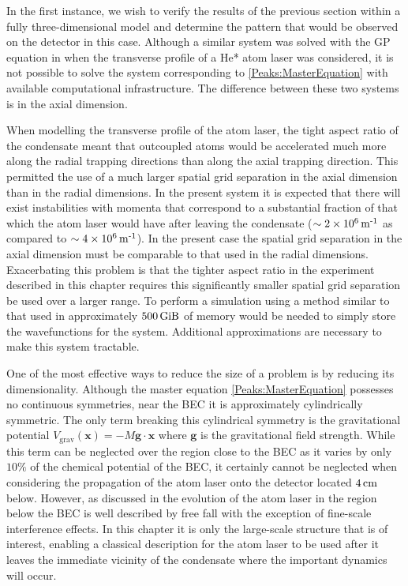In the first instance, we wish to verify the results of the previous section within a fully three-dimensional model and determine the pattern that would be observed on the detector in this case. Although a similar system was solved with the GP equation in  when the transverse profile of a He* atom laser was considered, it is not possible to solve the system corresponding to \eqref{Peaks:MasterEquation} with available computational infrastructure. The difference between these two systems is in the axial dimension.

When modelling the transverse profile of the atom laser, the tight aspect ratio of the condensate meant that outcoupled atoms would be accelerated much more along the radial trapping directions than along the axial trapping direction. This permitted the use of a much larger spatial grid separation in the axial dimension than in the radial dimensions. In the present system it is expected that there will exist instabilities with momenta that correspond to a substantial fraction of that which the atom laser would have after leaving the condensate ($\sim \unit[2 \times 10^6]{m\textsuperscript{-1}}$ as compared to $\sim \unit[4 \times 10^6]{m\textsuperscript{-1}}$). In the present case the spatial grid separation in the axial dimension must be comparable to that used in the radial dimensions. Exacerbating this problem is that the tighter aspect ratio in the experiment described in this chapter requires this significantly smaller spatial grid separation be used over a larger range. To perform a simulation using a method similar to that used in  approximately $\unit[500]{GiB}$ of memory would be needed to simply store the wavefunctions for the system. Additional approximations are necessary to make this system tractable.

One of the most effective ways to reduce the size of a problem is by reducing its dimensionality. Although the master equation \eqref{Peaks:MasterEquation} possesses no continuous symmetries, near the BEC it is approximately cylindrically symmetric. The only term breaking this cylindrical symmetry is the gravitational potential $V_\text{grav}(\bm{x}) =- M \bm{g} \cdot \bm{x}$ where $\bm{g}$ is the gravitational field strength. While this term can be neglected over the region close to the BEC as it varies by only $10\%$ of the chemical potential of the BEC, it certainly cannot be neglected when considering the propagation of the atom laser onto the detector located $\unit[4]{cm}$ below. However, as discussed in  the evolution of the atom laser in the region below the BEC is well described by free fall with the exception of fine-scale interference effects. In this chapter it is only the large-scale structure that is of interest, enabling a classical description for the atom laser to be used after it leaves the immediate vicinity of the condensate where the important dynamics will occur.

